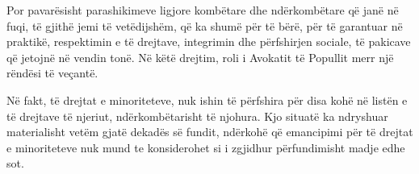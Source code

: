 \documentclass[a4paper]{article}
\begin{document}
Por pavarësisht parashikimeve ligjore kombëtare dhe ndërkombëtare që janë në fuqi, të gjithë jemi të vetëdijshëm, që ka shumë për të bërë, për të  garantuar në praktikë, respektimin e të drejtave, integrimin dhe përfshirjen  sociale, të pakicave që jetojnë në vendin tonë. Në këtë drejtim, roli i Avokatit  të Popullit merr një rëndësi të veçantë.

Në fakt, të drejtat e minoriteteve, nuk ishin të përfshira për disa kohë në  listën e të drejtave të njeriut, ndërkombëtarisht të njohura. Kjo situatë ka  ndryshuar materialisht vetëm gjatë dekadës së fundit, ndërkohë që  emancipimi për të drejtat e minoriteteve nuk mund te konsiderohet si i zgjidhur  përfundimisht madje edhe sot.
\end{document}
